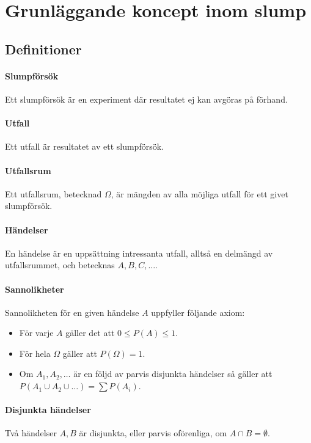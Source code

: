\section{Grunläggande koncept inom slump}

\subsection{Definitioner}

\paragraph{Slumpförsök}
Ett slumpförsök är en experiment där resultatet ej kan avgöras på förhand.

\paragraph{Utfall}
Ett utfall är resultatet av ett slumpförsök.

\paragraph{Utfallsrum}
Ett utfallsrum, betecknad $\Omega$, är mängden av alla möjliga utfall för ett givet slumpförsök.

\paragraph{Händelser}
En händelse är en uppsättning intressanta utfall, alltså en delmängd av utfallsrummet, och betecknas $A, B, C, \dots$.

\paragraph{Sannolikheter}
Sannolikheten för en given händelse $A$ uppfyller följande axiom:
\begin{itemize}
	\item För varje $A$ gäller det att $0\leq P(A)\leq 1$.
	\item För hela $\Omega$ gäller att $P(\Omega) = 1$.
	\item Om $A_1, A_2, \dots$ är en följd av parvis disjunkta händelser så gäller att $P(A_1\cup A_2\cup\dots) = \sum P(A_i)$.
\end{itemize}

\paragraph{Disjunkta händelser}
Två händelser $A, B$ är disjunkta, eller parvis oförenliga, om $A\cap B = \emptyset$.

